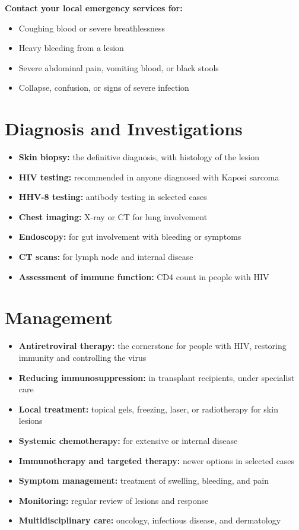 \textbf{Contact your local emergency services for:}
\begin{itemize}
    \item Coughing blood or severe breathlessness
    \item Heavy bleeding from a lesion
    \item Severe abdominal pain, vomiting blood, or black stools
    \item Collapse, confusion, or signs of severe infection
\end{itemize}

\section*{Diagnosis and Investigations}
\begin{itemize}
    \item \textbf{Skin biopsy:} the definitive diagnosis, with histology of the lesion
    \item \textbf{HIV testing:} recommended in anyone diagnosed with Kaposi sarcoma
    \item \textbf{HHV-8 testing:} antibody testing in selected cases
    \item \textbf{Chest imaging:} X-ray or CT for lung involvement
    \item \textbf{Endoscopy:} for gut involvement with bleeding or symptoms
    \item \textbf{CT scans:} for lymph node and internal disease
    \item \textbf{Assessment of immune function:} CD4 count in people with HIV
\end{itemize}

\section*{Management}
\begin{itemize}
    \item \textbf{Antiretroviral therapy:} the cornerstone for people with HIV, restoring immunity and controlling the virus
    \item \textbf{Reducing immunosuppression:} in transplant recipients, under specialist care
    \item \textbf{Local treatment:} topical gels, freezing, laser, or radiotherapy for skin lesions
    \item \textbf{Systemic chemotherapy:} for extensive or internal disease
    \item \textbf{Immunotherapy and targeted therapy:} newer options in selected cases
    \item \textbf{Symptom management:} treatment of swelling, bleeding, and pain
    \item \textbf{Monitoring:} regular review of lesions and response
    \item \textbf{Multidisciplinary care:} oncology, infectious disease, and dermatology
\end{itemize}

